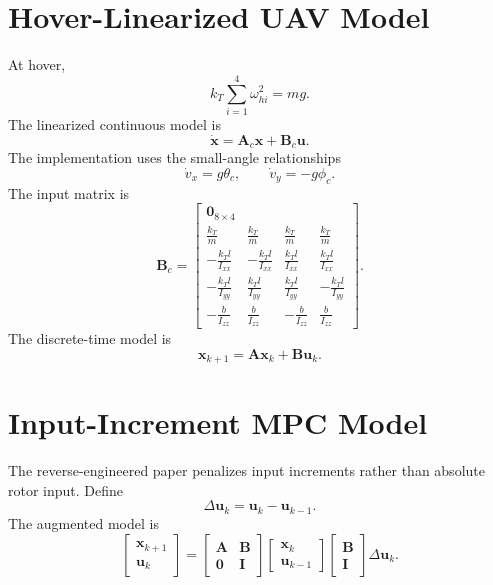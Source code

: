 \documentclass[12pt,a4paper]{report}
\begin{document}
\section{Hover-Linearized UAV Model}
At hover,
\begin{equation}
k_T\sum_{i=1}^{4}\omega_{hi}^{2}=mg.
\end{equation}
The linearized continuous model is
\begin{equation}
\dot{\bm{x}}=\bm{A}_c\bm{x}+\bm{B}_c\bm{u}.
\end{equation}
The implementation uses the small-angle relationships
\begin{equation}
\dot{v}_x=g\theta_c,\qquad
\dot{v}_y=-g\phi_c.
\end{equation}
The input matrix is
\begin{equation}
\bm{B}_c =
\begin{bmatrix}
\bm{0}_{8\times 4}\\
\frac{k_T}{m} & \frac{k_T}{m} & \frac{k_T}{m} & \frac{k_T}{m}\\
-\frac{k_Tl}{I_{xx}} & -\frac{k_Tl}{I_{xx}} & \frac{k_Tl}{I_{xx}} & \frac{k_Tl}{I_{xx}}\\
-\frac{k_Tl}{I_{yy}} & \frac{k_Tl}{I_{yy}} & \frac{k_Tl}{I_{yy}} & -\frac{k_Tl}{I_{yy}}\\
-\frac{b}{I_{zz}} & \frac{b}{I_{zz}} & -\frac{b}{I_{zz}} & \frac{b}{I_{zz}}
\end{bmatrix}.
\end{equation}
The discrete-time model is
\begin{equation}
\bm{x}_{k+1}=\bm{A}\bm{x}_k+\bm{B}\bm{u}_k.
\end{equation}

\section{Input-Increment MPC Model}
The reverse-engineered paper penalizes input increments rather than absolute rotor input. Define
\begin{equation}
\Delta\bm{u}_k=\bm{u}_k-\bm{u}_{k-1}.
\end{equation}
The augmented model is
\begin{equation}
\begin{bmatrix}
\bm{x}_{k+1}\\
\bm{u}_{k}
\end{bmatrix}
=
\begin{bmatrix}
\bm{A} & \bm{B}\\
\bm{0} & \bm{I}
\end{bmatrix}
\begin{bmatrix}
\bm{x}_{k}\\
\bm{u}_{k-1}
\end{bmatrix}
\begin{bmatrix}
\bm{B}\\
\bm{I}
\end{bmatrix}
\Delta\bm{u}_k.
\end{equation}
\end{document}
